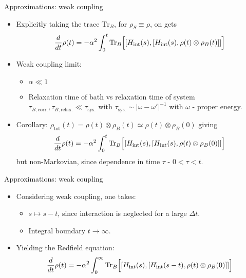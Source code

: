 \documentclass[10pt,xcolor={table,dvipsnames},t]{beamer}
\newcommand{\dt}{\frac{d}{dt}}
\newcommand{\Hint}{H_{\text{int}}}
\begin{document}
\begin{frame}{Approximations: weak coupling}
  \begin{itemize}
    \item<1-> Explicitly taking the trace $\text{Tr}_B$, for $\rho_S \equiv \rho$, on gets
      \begin{equation}
        \dt \rho(t) = - \alpha^2 \int_0^t \text{Tr}_B \Bigl[[\Hint(s),[\Hint(s), \rho(t)\otimes \rho_B(t)]] \Bigr]
      \end{equation}
\item<2-> Weak coupling limit: 
  \begin{itemize}
    \item<2-> $\alpha \ll 1$
    \item<2-> Relaxation time of bath vs relaxation time of system 
      $\tau_{B,\text{corr.}}, \tau_{B, \text{relax.}} \ll \tau_{\text{sys.}}$ with 
      $\tau_{\text{sys.}} \sim |\omega - \omega'|^{-1}$ with $\omega$ - proper energy.
  \end{itemize}
\item<3-> Corollary: $\rho_{\text{tot}}(t) = \rho(t)\otimes \rho_B(t) \simeq \rho(t) \otimes \rho_B(0)$ giving 
      \begin{equation}
        \dt \rho(t) = - \alpha^2 \int_0^t \text{Tr}_B \Bigl[[\Hint(s),[\Hint(s), \rho(t)\otimes \rho_B(0)]] \Bigr]
      \end{equation}
      but non-Markovian, since dependence in time $\tau$ - $0<\tau<t$.
  \end{itemize}
\end{frame}

\begin{frame}{Approximations: weak coupling}
  \begin{itemize}
    \item<1-> Considering weak coupling, one takes:
      \begin{itemize}
        \item<1-> $s\mapsto s-t$, since interaction is neglected for a large $\Delta t$.
    \item<1-> Integral boundary $t\rightarrow \infty$.
    \end{itemize}
  \item<2-> Yielding the Redfield equation:
      \begin{equation}
        \dt \rho(t) = - \alpha^2 \int_0^\infty \text{Tr}_B \Bigl[[\Hint(s),[\Hint(s-t), \rho(t)\otimes \rho_B(0)]] \Bigr]
      \end{equation}
  \end{itemize}
\end{frame}
\end{document}
